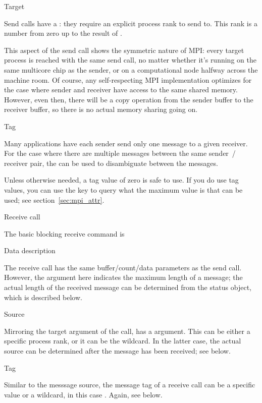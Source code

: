  {Target}

Send calls have a : they require an
explicit process rank to send to.  This rank is a number from zero up
to the result of .

This aspect of the send call shows the symmetric nature of MPI: every
target process is reached with the same send call, no matter whether it's
running on the same multicore chip as the sender, or on a
computational node halfway across the machine room. Of course, any
self-respecting MPI implementation optimizes for the case where sender
and receiver have access to the same shared memory. However, even
then, there will be a copy operation from the sender buffer to the
receiver buffer, so there is no actual memory sharing going on.

 {Tag}

Many applications have each sender send only one message to a given
receiver.
For the case where there are
multiple messages between the same sender~/ receiver pair,
the  can be used to disambiguate between
the messages.

Unless otherwise needed, a tag value of zero is safe to use. If you do
use tag values, you can use the key  to query
what the maximum value is that can be used; see
section~\ref{sec:mpi_attr}.

 {Receive call}

The basic blocking receive command is
%

 {Data description}

The receive call has the same buffer/count/data parameters as the send
call.
However, 
the  argument here indicates the maximum length of a message; the
actual length of the received message can be determined 
from the status object, which is described below.

 {Source}

Mirroring the target argument of the  call,
 has a 
argument.
This can be either a specific process rank, or it can be the
 wildcard. In the latter case, the actual
source can be determined after the message has been received; see below.

 {Tag}

Similar to the messsage source, the message tag of a receive call can
be a specific value or a wildcard, in this case
.
Again, see below.

